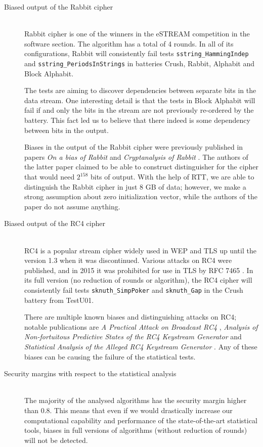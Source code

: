 \documentclass[
	digital,    %
	oneside,    %
	color,
	11pt,
	nocover,
	notable,
	nolof,
	nolot,
]{fithesis3}
\theoremstyle{definition}
\theoremstyle{remark}
\begin{document}
\begin{description}
\item[Biased output of the Rabbit cipher] \hfill \\
Rabbit \cite{rabbit} cipher is one of the winners in the eSTREAM competition in the software section. The algorithm has a total of 4 rounds. In all of its configurations, Rabbit will consistently fail tests \texttt{sstring\_HammingIndep} and \texttt{sstring\_PeriodsInStrings} in batteries Crush, Rabbit, Alphabit and Block Alphabit. 

The tests are aiming to discover dependencies between separate bits in the data stream. One interesting detail is that the tests in Block Alphabit will fail if and only the bits in the stream are not previously re-ordered by the battery. This fact led us to believe that there indeed is some dependency between bits in the output.

Biases in the output of the Rabbit cipher were previously published in papers \textit{On a bias of Rabbit} \cite{rabbit-bias-1} and \textit{Cryptanalysis of Rabbit} \cite{rabbit-bias-2}. The authors of the latter paper claimed to be able to construct distinguisher for the cipher that would need $2^{158}$ bits of output. With the help of RTT, we are able to distinguish the Rabbit cipher in just 8 GB of data; however, we make a strong assumption about zero initialization vector, while the authors of the paper do not assume anything.

\item[Biased output of the RC4 cipher] \hfill \\
RC4 \cite{rc4} is a popular stream cipher widely used in WEP and TLS up until the version 1.3 when it was discontinued. Various attacks on RC4 were published, and in 2015 it was prohibited for use in TLS by RFC 7465 \cite{rfc7465}. In its full version (no reduction of rounds or algorithm), the RC4 cipher will consistently fail tests \texttt{sknuth\_SimpPoker} and \texttt{sknuth\_Gap} in the Crush battery from TestU01.

There are multiple known biases and distinguishing attacks on RC4; notable publications are \textit{A Practical Attack on Broadcast RC4} \cite{rc4-bias-1}, \textit{Analysis of Non-fortuitous Predictive States of the RC4 Keystream Generator} \cite{rc4-bias-2} and \textit{Statistical Analysis of the Alleged RC4 Keystream Generator} \cite{rc4-bias-3}. Any of these biases can be causing the failure of the statistical tests.

\item[Security margins with respect to the statistical analysis] \hfill \\
The majority of the analysed algorithms has the security margin higher than 0.8. This means that even if we would drastically increase our computational capability and performance of the state-of-the-art statistical tools, biases in full versions of algorithms (without reduction of rounds) will not be detected.


\end{description}
\end{document}
